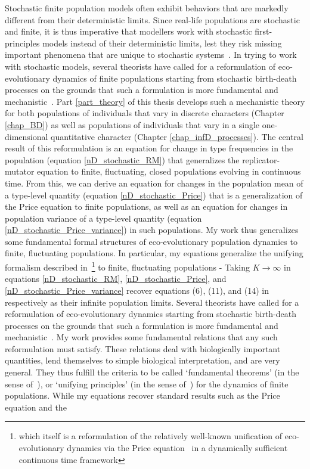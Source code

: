 Stochastic finite population models often exhibit behaviors that are markedly different from their deterministic limits. Since real-life populations are stochastic and finite, it is thus imperative that modellers work with stochastic first-principles models instead of their deterministic limits, lest they risk missing important phenomena that are unique to stochastic systems~\citep{black_stochastic_2012,schreiber_does_2022,hastings_transients_2004,shoemaker_integrating_2020}. In trying to work with stochastic models, several theorists have called for a reformulation of eco-evolutionary dynamics of finite populations starting from stochastic birth-death processes on the grounds that such a formulation is more fundamental and mechanistic~\citep{metcalf_why_2007,geritz_mathematical_2012,doebeli_towards_2017}. Part \ref{part_theory} of this thesis develops such a mechanistic theory for both populations of individuals that vary in discrete characters (Chapter \ref{chap_BD}) as well as populations of individuals that vary in a single one-dimensional quantitative character (Chapter \ref{chap_infD_processes}). The central result of this reformulation is an equation for change in type frequencies in the population (equation \eqref{nD_stochastic_RM}) that generalizes the replicator-mutator equation to finite, fluctuating, closed populations evolving in continuous time. From this, we can derive an equation for changes in the population mean of a type-level quantity (equation \eqref{nD_stochastic_Price}) that is a generalization of the Price equation to finite populations, as well as an equation for changes in population variance of a type-level quantity (equation \eqref{nD_stochastic_Price_variance}) in such populations. My work thus generalizes some fundamental formal structures of eco-evolutionary population dynamics to finite, fluctuating populations. In particular, my equations generalize the unifying formalism described in~\cite{lion_theoretical_2018}\footnote{which itself is a reformulation of the relatively well-known unification of eco-evolutionary dynamics via the Price equation~\citep{frank_natural_2012, queller_fundamental_2017, luque_mirror_2021} in a dynamically sufficient continuous time framework} to finite, fluctuating populations - Taking $K \to \infty$ in equations \eqref{nD_stochastic_RM}, \eqref{nD_stochastic_Price}, and \eqref{nD_stochastic_Price_variance} recover equations (6), (11), and (14) in~\cite{lion_theoretical_2018} respectively as their infinite population limits. Several theorists have called for a reformulation of eco-evolutionary dynamics starting from stochastic birth-death processes on the grounds that such a formulation is more fundamental and mechanistic~\citep{metcalf_why_2007,geritz_mathematical_2012,doebeli_towards_2017}. My work provides some fundamental relations that any such reformulation must satisfy. These relations deal with biologically important quantities, lend themselves to simple biological interpretation, and are very general. They thus fulfill the criteria to be called `fundamental theorems' (in the sense of~\cite{queller_fundamental_2017}), or `unifying principles' (in the sense of~\cite{lion_theoretical_2018}) for the dynamics of finite populations. While my equations recover standard results such as the Price equation and the 